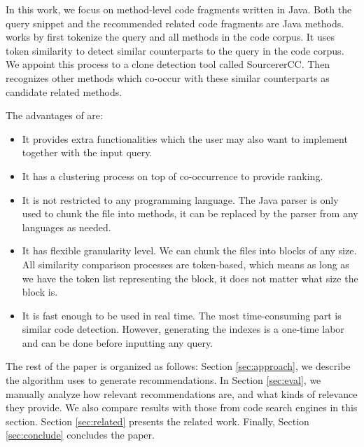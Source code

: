 In this work, we focus on method-level code fragments written in Java. Both the query snippet and the recommended related code fragments are Java methods. {\tool} works by first tokenize the query and all methods in the code corpus. It uses token similarity to detect similar counterparts to the query in the code corpus. We appoint this process to a clone detection tool called SourcererCC. Then {\tool} recognizes other methods which co-occur with these similar counterparts as candidate related methods. 

The advantages of {\tool} are:
\begin{itemize}
	\item It provides extra functionalities which the user may also want to implement together with the input query.
	\item It has a clustering process on top of co-occurrence to provide ranking.
	\item It is not restricted to any programming language. The Java parser is only used to chunk the file into methods, it can be replaced by the parser from any languages as needed.
	\item It has flexible granularity level. We can chunk the files into blocks of any size. All similarity comparison processes are token-based, which means as long as we have the token list representing the block, it does not matter what size the block is.
	\item It is fast enough to be used in real time. The most time-consuming part is similar code detection. However, generating the indexes is a one-time labor and can be done before inputting any query.	
\end{itemize}

The rest of the paper is organized as follows: Section \ref{sec:approach}, we describe the algorithm {\tool} uses to generate recommendations. In Section \ref{sec:eval}, we manually analyze how relevant {\tool} recommendations are, and what kinds of relevance they provide. We also compare {\tool} results with those from code search engines in this section. Section \ref{sec:related} presents the related work. Finally, Section \ref{sec:conclude} concludes the paper.